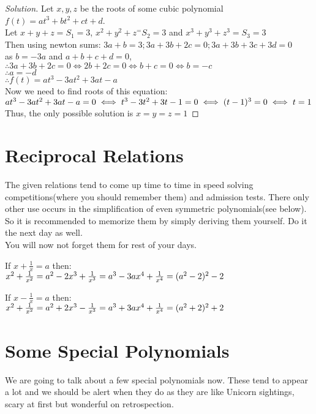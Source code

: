 \begin{proof}
    [Solution]
    Let $x,y,z$ be the roots of some cubic polynomial $f(t)=at^3+bt^2+ct+d$.\\
    Let $x+y+z=S_1=3$, $x^2+y^2+z^=S_2=3$ and $x^3+y^3+z^3=S_3=3$\\
    Then using newton sums: $3a+b=3 ; 3a+3b+2c=0; 3a+3b+3c+3d=0$\\
    as $b=-3a$ and $a+b+c+d=0$,
    $\therefore 3a+3b+2c=0 \iff 2b+2c=0 \iff b+c=0 \iff b=-c$\\
    $\therefore a=-d$\\
    $\therefore f(t)= at^3-3at^2+3at-a$\\
    Now we need to find roots of this equation:\\
    $at^3-3at^2+3at-a=0\\
    \iff t^3-3t^2+3t-1=0
    \iff (t-1)^3=0\\
    \iff t=1$\\
    Thus, the only possible solution is $x=y=z=1$
\end{proof}
\section{Reciprocal Relations}
The given relations tend to come up time to time in speed solving competitions(where you should remember them) and admission tests. There only other use occurs in the simplification of even symmetric polynomials(see below). So it is recommended to memorize them by simply deriving them yourself. Do it the next day as well.\\
You will now not forget them for rest of your days.
\begin{theorem}
    If $x+\frac{1}{x}=a$ then:\\
    $x^2+\frac{1}{x^2}=a^2-2\\
    x^3+\frac{1}{x^3}=a^3-3a\\
    x^4+\frac{1}{x^4}=(a^2-2)^2-2$
\end{theorem}
\begin{theorem}
    If $x-\frac{1}{x}=a$ then:\\
    $x^2+\frac{1}{x^2}=a^2+2\\
    x^3-\frac{1}{x^3}=a^3+3a\\
    x^4+\frac{1}{x^4}=(a^2+2)^2+2$
\end{theorem}
\section{Some Special Polynomials}
We are going to talk about a few special polynomials now. These tend to appear a lot and we should be alert when they do as they are like Unicorn sightings, scary at first but wonderful on retrospection.
